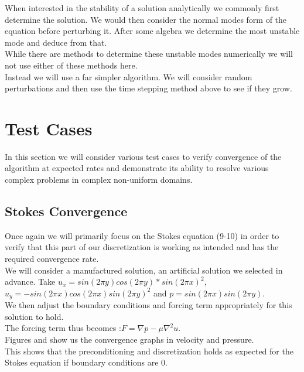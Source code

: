 \documentclass[11pt,twoside,a4paper]{article}
\begin{document}
When interested in the stability of a solution analytically we commonly first determine the solution. We would then consider the normal modes form of the equation before perturbing it. After some algebra we determine the most unstable mode and deduce from that.\\
While there are methods to determine these unstable modes numerically we will not use either of these methods here.\\
Instead we will use a far simpler algorithm.
We will consider random perturbations and then use the time stepping method above to see if they grow.

\section{Test Cases}
In this section we will consider various test cases to verify convergence of the algorithm at expected rates and demonstrate its ability to resolve various complex problems in complex non-uniform domains.
\subsection{Stokes Convergence}

Once again we will primarily focus on the Stokes equation (9-10) in order to verify that this part of our discretization is working as intended and has the required convergence rate.\\
We will consider a manufactured solution, an artificial solution we selected in advance. Take $u_x = sin(2 \pi y) cos(2 \pi y)*sin(2 \pi x)^2$, $u_y= -sin(2 \pi x) cos(2 \pi x) sin(2 \pi y)^2$ and $p = sin(2 \pi x) sin(2 \pi y)$.\\
We then adjust the boundary conditions and forcing term appropriately for this solution to hold.\\
 The forcing term thus becomes :$F = \nabla p - \mu \nabla^2 u$.\\
Figures and show us the convergence graphs in velocity and pressure.\\
This shows that the preconditioning and discretization holds as expected for the Stokes equation if boundary conditions are $0$.
\\
\end{document}
